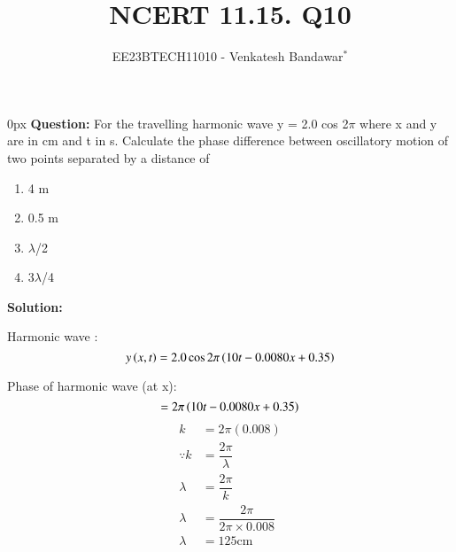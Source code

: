 \documentclass[journal,12pt,twocolumn]{IEEEtran}
\theoremstyle{remark}
\begin{document}

\vspace{3cm}

\title{NCERT 11.15. Q10}
\author{EE23BTECH11010 - Venkatesh Bandawar$^{*}$%
}
\maketitle
\newpage
\bigskip

\renewcommand{\thefigure}{\theenumi}
\renewcommand{\thetable}{\theenumi}



\parindent 0px
\textbf{Question:} For the travelling harmonic wave
y = 2.0 cos 2$\pi$  where x and y are in cm and t in s. Calculate the phase difference between oscillatory
motion of two points separated by a distance of 

\begin{enumerate} [label=(\alph*)]
    \item 4 m
    \item 0.5 m
    \item $\lambda$/2
    \item 3$\lambda$/4
\end{enumerate}

\textbf{Solution:}  

Harmonic wave :
\begin{equation}
    y\left(x, t\right) = 2.0 \cos 2\pi \left(10t - 0.0080 x + 0.35\right)
\end{equation}

Phase of harmonic wave (at x):
\begin{equation}
    = 2\pi \left(10t - 0.0080x + 0.35\right)
\end{equation}
\begin{align}
    k &= 2\pi(0.008) \label{} \\
    \because k &= \dfrac{2\pi}{\lambda} \\
    \lambda &= \dfrac{2\pi}{k} \\
    \lambda &= \dfrac{2\pi}{2 \pi \times 0.008} \\
    \lambda &= 125 \text{cm}
\end{align}
\end{document}
